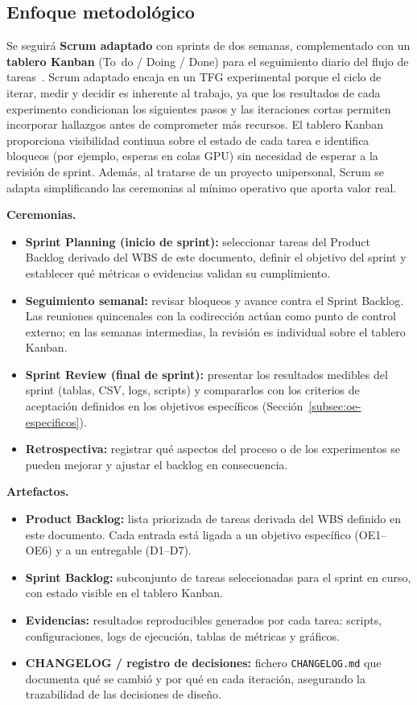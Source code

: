 \subsection{Enfoque metodológico}

Se seguirá \textbf{Scrum adaptado} con sprints de dos semanas, complementado con un \textbf{tablero Kanban} (To~do / Doing / Done) para el seguimiento diario del flujo de tareas~\cite{schwaber2020scrum}. Scrum adaptado encaja en un TFG experimental porque el ciclo de iterar, medir y decidir es inherente al trabajo, ya que los resultados de cada experimento condicionan los siguientes pasos y las iteraciones cortas permiten incorporar hallazgos antes de comprometer más recursos. El tablero Kanban proporciona visibilidad continua sobre el estado de cada tarea e identifica bloqueos (por ejemplo, esperas en colas GPU) sin necesidad de esperar a la revisión de sprint. Además, al tratarse de un proyecto unipersonal, Scrum se adapta simplificando las ceremonias al mínimo operativo que aporta valor real.

\textbf{Ceremonias.}
\begin{itemize}[nosep,leftmargin=*]
\item \textbf{Sprint Planning (inicio de sprint):} seleccionar tareas del Product Backlog derivado del WBS de este documento, definir el objetivo del sprint y establecer qué métricas o evidencias validan su cumplimiento.
\item \textbf{Seguimiento semanal:} revisar bloqueos y avance contra el Sprint Backlog. Las reuniones quincenales con la codirección actúan como punto de control externo; en las semanas intermedias, la revisión es individual sobre el tablero Kanban.
\item \textbf{Sprint Review (final de sprint):} presentar los resultados medibles del sprint (tablas, CSV, logs, scripts) y compararlos con los criterios de aceptación definidos en los objetivos específicos (Sección~\ref{subsec:oe-especificos}).
\item \textbf{Retrospectiva:} registrar qué aspectos del proceso o de los experimentos se pueden mejorar y ajustar el backlog en consecuencia.
\end{itemize}

\textbf{Artefactos.}
\begin{itemize}[nosep,leftmargin=*]
\item \textbf{Product Backlog:} lista priorizada de tareas derivada del WBS definido en este documento. Cada entrada está ligada a un objetivo específico (OE1--OE6) y a un entregable (D1--D7).
\item \textbf{Sprint Backlog:} subconjunto de tareas seleccionadas para el sprint en curso, con estado visible en el tablero Kanban.
\item \textbf{Evidencias:} resultados reproducibles generados por cada tarea: scripts, configuraciones, logs de ejecución, tablas de métricas y gráficos.
\item \textbf{CHANGELOG / registro de decisiones:} fichero \texttt{CHANGELOG.md} que documenta qué se cambió y por qué en cada iteración, asegurando la trazabilidad de las decisiones de diseño.
\end{itemize}

